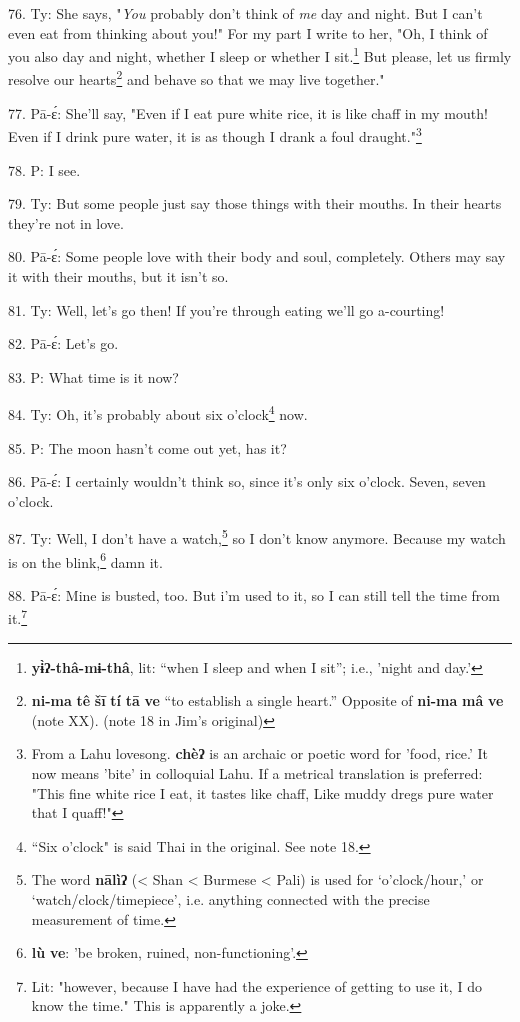 76. Ty: She says, "\textit{You} probably don't think of \textit{me}
day and night. But I can't even eat from thinking about you!" For my part
I write to her, "Oh, I think of you also day and night, whether I sleep
or whether I sit.\footnote{\textbf{yɨ̀ʔ-thâ-mɨ-thâ}, lit: ``when I sleep and when I sit''; i.e., 'night and day.'} But please, let us firmly resolve our hearts\footnote{\textbf{ni-ma} \textbf{tê} \textbf{šī} \textbf{tí} \textbf{tā} \textbf{ve} ``to establish a single heart.'' Opposite of \textbf{ni-ma} \textbf{mâ} \textbf{ve} (note XX). (note 18 in Jim's original)} and behave
so that we may live together."

77. Pā-ɛ́: She'll say, "Even if I eat pure white rice, it is like chaff
in my mouth! Even if I drink pure water, it is as though I drank a foul draught."\footnote{From a Lahu lovesong. \textbf{chèʔ} is an archaic or poetic word for 'food, rice.' It now means 'bite' in colloquial Lahu. If a metrical translation is preferred: "This fine white rice I eat, it tastes like chaff, Like muddy dregs pure water that I quaff!"}

78. P: I see.

79. Ty: But some people just say those things with their mouths. In their
hearts they're not in love.

80. Pā-ɛ́: Some people love with their body and soul, completely. Others may
say it with their mouths, but it isn't so.

81. Ty: Well, let's go then! If you're through eating we'll go a-courting!

82. Pā-ɛ́: Let's go.

83. P: What time is it now?

84. Ty: Oh, it's probably about\textit{ }six o'clock\footnote{``Six o'clock" is said Thai in the original. See note 18.} now.

85. P: The moon hasn't come out yet, has it?

86. Pā-ɛ́: I certainly wouldn't think so, since it's only six o'clock. Seven,
seven o'clock.

87. Ty: Well, I don't have a watch,\footnote{The word \textbf{nālìʔ} (< Shan < Burmese < Pali) is used for `o'clock/hour,' or `watch/clock/timepiece', i.e. anything connected with the precise measurement of time.} so I don't know anymore. Because my
watch is on the blink,\footnote{\textbf{lù} \textbf{ve}: 'be broken, ruined, non-functioning'.} damn it.

88. Pā-ɛ́: Mine is busted, too. But i'm used to it, so I can still tell the
time from it.\footnote{Lit: "however, because I have had the experience of getting to use it, I do know the time." This is apparently a joke.}

